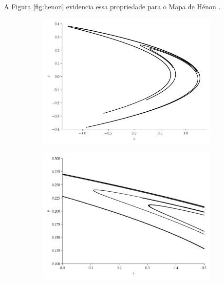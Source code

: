 \documentclass[a4paper, 12pt]{article}
\begin{document}
A Figura \ref{fig:henon} evidencia essa propriedade para o Mapa de Hénon \cite{henon1976two}.
\begin{figure}[!ht]
	\centering
	\begin{subfigure}[b]{0.45\textwidth}
		\includegraphics[scale=0.4]{mapa-de-henon.png}
	\end{subfigure}
	\begin{subfigure}[b]{0.45\textwidth}
		\includegraphics[scale=0.4]{mapa-de-henon-zoom.png}
	\end{subfigure}
	\\
	\begin{subfigure}[b]{0.45\textwidth}

\end{subfigure}
\end{figure}
\end{document}
